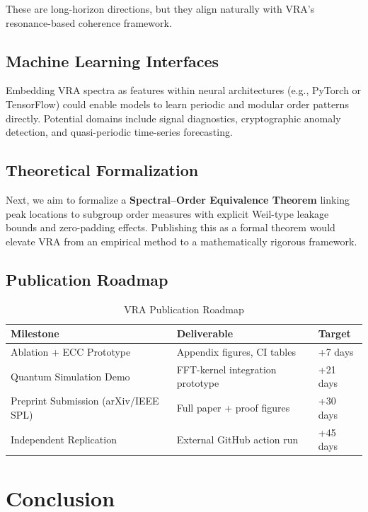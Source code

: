 \documentclass[conference]{IEEEtran}
\begin{document}
These are long-horizon directions, but they align naturally with VRA's resonance-based coherence framework.

\subsection{Machine Learning Interfaces}

Embedding VRA spectra as features within neural architectures (e.g., PyTorch or TensorFlow) could enable models to learn periodic and modular order patterns directly.
Potential domains include signal diagnostics, cryptographic anomaly detection, and quasi-periodic time-series forecasting.

\subsection{Theoretical Formalization}

Next, we aim to formalize a \textbf{Spectral–Order Equivalence Theorem} linking peak locations to subgroup order measures with explicit Weil-type leakage bounds and zero-padding effects.
Publishing this as a formal theorem would elevate VRA from an empirical method to a mathematically rigorous framework.

\subsection{Publication Roadmap}

\begin{table}[h]
\centering
\caption{VRA Publication Roadmap}
\begin{tabular}{lll}
\toprule
\textbf{Milestone} & \textbf{Deliverable} & \textbf{Target} \\
\midrule
Ablation + ECC Prototype & Appendix figures, CI tables & +7 days \\
Quantum Simulation Demo & FFT-kernel integration prototype & +21 days \\
Preprint Submission (arXiv/IEEE SPL) & Full paper + proof figures & +30 days \\
Independent Replication & External GitHub action run & +45 days \\
\bottomrule
\end{tabular}
\end{table}


\section{Conclusion}
\end{document}
